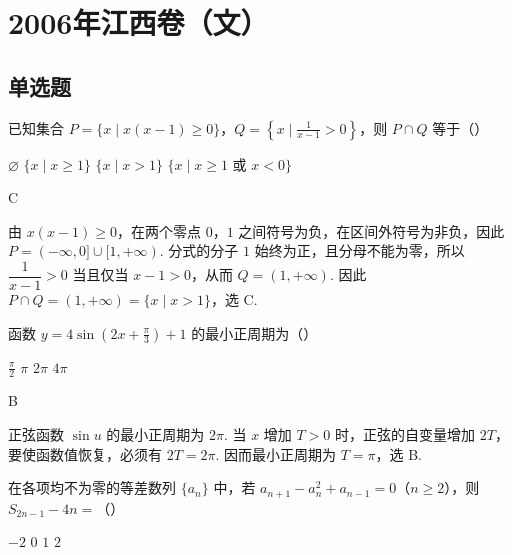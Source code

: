 \chapter{2006年江西卷（文）}
\section{单选题}
\begin{problem}
已知集合 \(P = \{x \mid x(x - 1) \geqslant 0\}\)，\(Q = \left\{x \mid \frac{1}{x - 1} > 0\right\}\)，则 \(P \cap Q\) 等于（\quad）

\choices
    {\( \varnothing \)}
    {\(\{x\mid x\geqslant 1\}\)}
    {\( \{x \mid x > 1\} \)}
    {\(\{x\mid x\geqslant 1 \text{\ 或\ } x < 0\}\)}
\end{problem}

\begin{answer}
C
\end{answer}

\begin{solution}
由 \(x(x-1)\geqslant0\)，在两个零点 \(0\)，\(1\) 之间符号为负，在区间外符号为非负，因此 \(P=(-\infty,0]\cup[1,+\infty)\). 分式的分子 \(1\) 始终为正，且分母不能为零，所以 \(\dfrac{1}{x-1}>0\) 当且仅当 \(x-1>0\)，从而 \(Q=(1,+\infty)\). 因此 \(P\cap Q=(1,+\infty)=\{x\mid x>1\}\)，选 C.
\end{solution}

\begin{problem}
函数 \( y = 4\sin \left(2x + \frac{\pi}{3}\right) + 1 \) 的最小正周期为（\quad）

\choices
    {\(\frac{\pi}{2}\)}
    {\(\pi\)}
    {\(2\pi\)}
    {\(4\pi\)}
\end{problem}

\begin{answer}
B
\end{answer}

\begin{solution}
正弦函数 \(\sin u\) 的最小正周期为 \(2\pi\). 当 \(x\) 增加 \(T>0\) 时，正弦的自变量增加 \(2T\)，要使函数值恢复，必须有 \(2T=2\pi\). 因而最小正周期为 \(T=\pi\)，选 B.
\end{solution}

\begin{problem}
在各项均不为零的等差数列 \(\{a_{n}\}\) 中，若 \(a_{n + 1} - a_n^2 + a_{n - 1} = 0\)（\(n \geqslant 2\)），则 \(S_{2n - 1} - 4n =\)（\quad）

\choices
    {\(-2\)}
    {\(0\)}
    {\(1\)}
    {\(2\)}
\end{problem}

